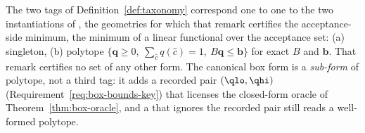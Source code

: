 
\begin{remark}\label{rem:two-tags}
The two tags of Definition~\ref{def:taxonomy} correspond one to one to the two
instantiations of , the geometries
for which that remark certifies the acceptance-side minimum, the minimum of a
linear functional over the acceptance set: (a) singleton, (b)
polytope $\{\mathbf{q}\ge0,\ \sum_{\hat c}q(\hat c)=1,\
B\mathbf{q}\le\mathbf{b}\}$ for exact $B$ and $\mathbf{b}$. That remark
certifies no set of any other form. The canonical box form is a
\emph{sub-form} of $\mathrm{polytope}$, not a third tag: it adds a recorded
pair $(\qlo,\qhi)$ (Requirement~\ref{req:box-bounds-key}) that licenses the
closed-form oracle of Theorem~\ref{thm:box-oracle}, and a \tref{consumer} that
ignores the recorded pair still reads a well-formed $\mathrm{polytope}$.
\end{remark}
